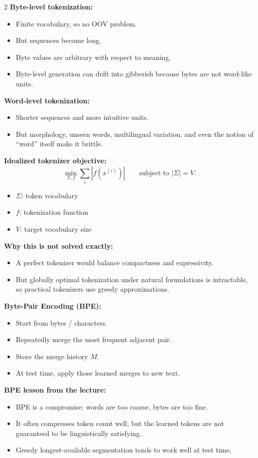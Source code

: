 \documentclass[10pt]{article}
\newenvironment{symdefs}{\begin{itemize}[leftmargin=1.1em, topsep=1pt, itemsep=0pt, parsep=0pt]}{\end{itemize}}
\newcommand{\sym}[2]{\item \textbf{#1}: #2}
\begin{document}
\begin{multicols*}{2}
\textbf{Byte-level tokenization:}
\begin{itemize}
\item Finite vocabulary, so no OOV problem.
\item But sequences become long.
\item Byte values are arbitrary with respect to meaning.
\item Byte-level generation can drift into gibberish because bytes are not word-like units.
\end{itemize}

\textbf{Word-level tokenization:}
\begin{itemize}
\item Shorter sequences and more intuitive units.
\item But morphology, unseen words, multilingual variation, and even the notion of ``word'' itself make it brittle.
\end{itemize}

\textbf{Idealized tokenizer objective:}
\[
\min_{\Sigma,f}
\sum_i |f(x^{(i)})|
\qquad
\text{subject to } |\Sigma|=V.
\]
\begin{symdefs}
\sym{\(\Sigma\)}{token vocabulary}
\sym{\(f\)}{tokenization function}
\sym{\(V\)}{target vocabulary size}
\end{symdefs}

\textbf{Why this is not solved exactly:}
\begin{itemize}
\item A perfect tokenizer would balance compactness and expressivity.
\item But globally optimal tokenization under natural formulations is intractable, so practical tokenizers use greedy approximations.
\end{itemize}

\textbf{Byte-Pair Encoding (BPE):}
\begin{itemize}
\item Start from bytes / characters.
\item Repeatedly merge the most frequent adjacent pair.
\item Store the merge history \(M\).
\item At test time, apply those learned merges to new text.
\end{itemize}

\textbf{BPE lesson from the lecture:}
\begin{itemize}
\item BPE is a compromise: words are too coarse, bytes are too fine.
\item It often compresses token count well, but the learned tokens are not guaranteed to be linguistically satisfying.
\item Greedy longest-available segmentation tends to work well at test time.
\end{itemize}


\end{multicols*}
\end{document}
